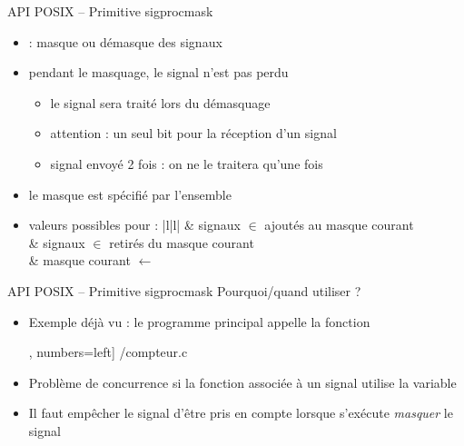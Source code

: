 \begin {frame} {API POSIX -- Primitive sigprocmask}

    \begin {itemize}
	\item {} : masque ou démasque des signaux
	\item pendant le masquage, le signal n'est pas perdu
	    \begin {itemize}
		\item le signal sera traité lors du démasquage
		\item attention : un seul bit pour la réception d'un signal
		\item \implique signal envoyé 2 fois : on
		    ne le traitera qu'une fois
	    \end {itemize}
	\item le masque est spécifié par l'ensemble 
	\item valeurs possibles pour  :
	    \ctableau {\fD} {|l|l|} {
		    & signaux $\in$  ajoutés au masque courant
		    \\
		    & signaux $\in$  retirés du masque courant
		    \\
		    & masque courant $\leftarrow$ 
		    \\
	    }
    \end {itemize}
\end {frame}

\begin {frame} {API POSIX -- Primitive sigprocmask}
    Pourquoi/quand utiliser  ?

    \begin {itemize}
	\item Exemple déjà vu : le programme principal appelle la
	    fonction 

	    \fE\lstmonstyle, numbers=left] {\inc/compteur.c}

	\item Problème de concurrence si la fonction associée à un
	    signal utilise la variable 

	\item Il faut empêcher le signal d'être pris en compte lorsque
	     s'exécute
	    \implique \textit{masquer} le signal

    \end {itemize}
\end {frame}

